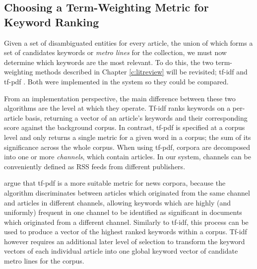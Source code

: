\subsection{Choosing a Term-Weighting Metric for Keyword Ranking}

Given a set of disambiguated entities for every article, the union of which forms a set of candidates keywords or \textit{metro lines} for the collection, we must now determine which keywords are the most relevant. To do this, the two term-weighting methods described in Chapter \ref{c:litreview} will be revisited; tf-idf \citep{tfidf} and tf-pdf \citep{TopicExtractionfromnewsArchiveUsingTFPDFAlgorithm}. Both were implemented in the system so they could be compared.

From an implementation perspective, the main difference between these two algorithms are the level at which they operate. Tf-idf ranks keywords on a per-article basis, returning a vector of an article's keywords and their corresponding score against the background corpus. In contrast, tf-pdf is specified at a corpus level and only returns a single metric for a given word in a corpus; the sum of its significance across the whole corpus. When using tf-pdf, corpora are decomposed into one or more \textit{channels}, which contain articles. In our system, channels can be conveniently defined as RSS feeds from different publishers. 

\citeauthor{TopicExtractionfromnewsArchiveUsingTFPDFAlgorithm} argue that tf-pdf is a more suitable metric for news corpora, because the algorithm discriminates between articles which originated from the same channel and articles in different channels, allowing keywords which are highly (and uniformly) frequent in one channel to be identified as significant in documents which originated from a different channel. Similarly to tf-idf, this process can be used to produce a vector of the highest ranked keywords within a corpus. Tf-idf however requires an additional later level of selection to transform the keyword vectors of each individual article into one global keyword vector of candidate metro lines for the corpus. 

